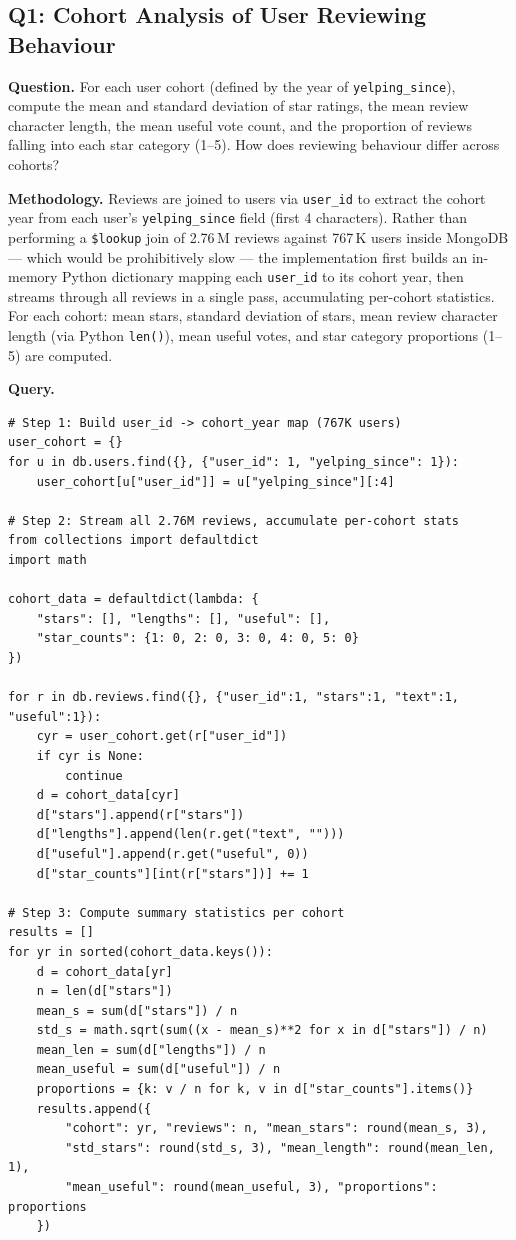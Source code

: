 \documentclass[11pt]{article}
\begin{document}
\subsection{Q1: Cohort Analysis of User Reviewing Behaviour}

\textbf{Question.} For each user cohort (defined by the year of \texttt{yelping\_since}), compute the mean and standard deviation of star ratings, the mean review character length, the mean useful vote count, and the proportion of reviews falling into each star category (1--5). How does reviewing behaviour differ across cohorts?

\textbf{Methodology.} Reviews are joined to users via \texttt{user\_id} to extract the cohort year from each user's \texttt{yelping\_since} field (first 4 characters). Rather than performing a \texttt{\$lookup} join of 2.76\,M reviews against 767\,K users inside MongoDB --- which would be prohibitively slow --- the implementation first builds an in-memory Python dictionary mapping each \texttt{user\_id} to its cohort year, then streams through all reviews in a single pass, accumulating per-cohort statistics. For each cohort: mean stars, standard deviation of stars, mean review character length (via Python \texttt{len()}), mean useful votes, and star category proportions (1--5) are computed.

\textbf{Query.}
\begin{lstlisting}[style=python, caption={Cohort analysis: Python-side streaming join.}, label={lst:q1-cohort}]
# Step 1: Build user_id -> cohort_year map (767K users)
user_cohort = {}
for u in db.users.find({}, {"user_id": 1, "yelping_since": 1}):
    user_cohort[u["user_id"]] = u["yelping_since"][:4]

# Step 2: Stream all 2.76M reviews, accumulate per-cohort stats
from collections import defaultdict
import math

cohort_data = defaultdict(lambda: {
    "stars": [], "lengths": [], "useful": [],
    "star_counts": {1: 0, 2: 0, 3: 0, 4: 0, 5: 0}
})

for r in db.reviews.find({}, {"user_id":1, "stars":1, "text":1, "useful":1}):
    cyr = user_cohort.get(r["user_id"])
    if cyr is None:
        continue
    d = cohort_data[cyr]
    d["stars"].append(r["stars"])
    d["lengths"].append(len(r.get("text", "")))
    d["useful"].append(r.get("useful", 0))
    d["star_counts"][int(r["stars"])] += 1

# Step 3: Compute summary statistics per cohort
results = []
for yr in sorted(cohort_data.keys()):
    d = cohort_data[yr]
    n = len(d["stars"])
    mean_s = sum(d["stars"]) / n
    std_s = math.sqrt(sum((x - mean_s)**2 for x in d["stars"]) / n)
    mean_len = sum(d["lengths"]) / n
    mean_useful = sum(d["useful"]) / n
    proportions = {k: v / n for k, v in d["star_counts"].items()}
    results.append({
        "cohort": yr, "reviews": n, "mean_stars": round(mean_s, 3),
        "std_stars": round(std_s, 3), "mean_length": round(mean_len, 1),
        "mean_useful": round(mean_useful, 3), "proportions": proportions
    })
\end{lstlisting}
\end{document}
